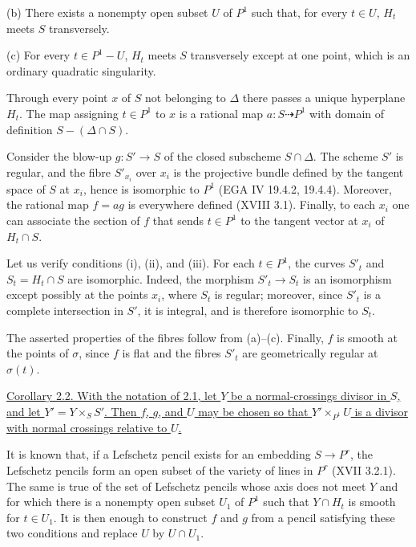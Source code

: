(b) There exists a nonempty open subset $U$ of $P^1$ such that, for
every $t\in U$, $H_t$ meets $S$ transversely.

(c) For every $t\in P^1-U$, $H_t$ meets $S$ transversely except at one
point, which is an ordinary quadratic singularity.

Through every point $x$ of $S$ not belonging to $\Delta$ there passes a
unique hyperplane $H_t$. The map assigning $t\in P^1$ to $x$ is a
rational map $a:S\dashrightarrow P^1$ with domain of definition
$S-(\Delta\cap S)$.

Consider the blow-up $g:S'\longrightarrow S$ of the closed subscheme
$S\cap\Delta$. The scheme $S'$ is regular, and the fibre $S'_{x_i}$ over
$x_i$ is the projective bundle defined by the tangent space of $S$ at
$x_i$, hence is isomorphic to $P^1$ (EGA IV 19.4.2, 19.4.4). Moreover,
the rational map $f=ag$ is everywhere defined (XVIII 3.1). Finally, to
each $x_i$ one can associate the section of $f$ that sends
$t\in P^1$ to the tangent vector at $x_i$ of $H_t\cap S$.

Let us verify conditions (i), (ii), and (iii). For each $t\in P^1$, the
curves $S'_t$ and $S_t=H_t\cap S$ are isomorphic. Indeed, the morphism
$S'_t\longrightarrow S_t$ is an isomorphism except possibly at the
points $x_i$, where $S_t$ is regular; moreover, since $S'_t$ is a
complete intersection in $S'$, it is integral, and is therefore
isomorphic to $S_t$.

The asserted properties of the fibres follow from (a)--(c). Finally,
$f$ is smooth at the points of $\sigma$, since $f$ is flat and the
fibres $S'_t$ are geometrically regular at $\sigma(t)$.


\underline{Corollary 2.2. With the notation of 2.1, let $Y$ be a
normal-crossings divisor in $S$, and let $Y'=Y\times_S S'$. Then $f$,
$g$, and $U$ may be chosen so that $Y'\times_{P^1}U$ is a divisor with
normal crossings relative to $U$.}

It is known that, if a Lefschetz pencil exists for an embedding
$S\longrightarrow P^r$, the Lefschetz pencils form an open subset of the
variety of lines in $P^r$ (XVII 3.2.1). The same is true of the set of
Lefschetz pencils whose axis does not meet $Y$ and for which there is a
nonempty open subset $U_1$ of $P^1$ such that $Y\cap H_t$ is smooth for
$t\in U_1$. It is then enough to construct $f$ and $g$ from a pencil
satisfying these two conditions and replace $U$ by $U\cap U_1$.

